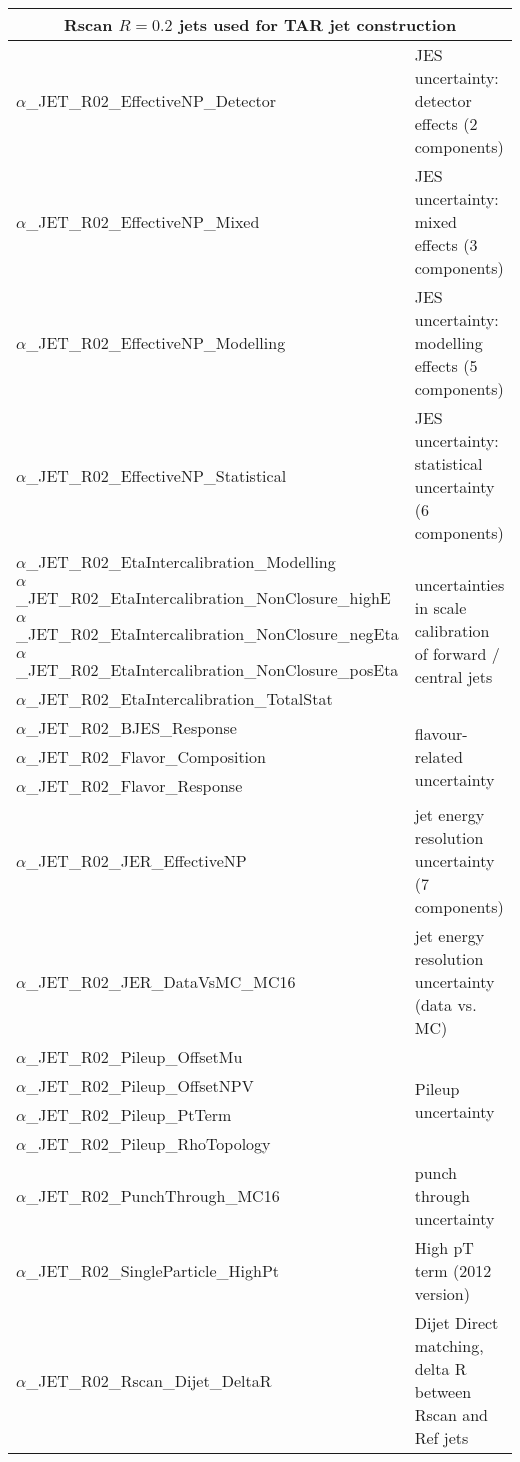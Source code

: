 {\begin{longtable}{p{7cm} p{8cm}}
\multicolumn{2}{c}{\textbf{Rscan \(R=0.2\) jets used for TAR jet construction }}  \\
\midrule
\(\alpha\)\_JET\_R02\_EffectiveNP\_Detector   & JES uncertainty: detector effects (2 components)        \\
\(\alpha\)\_JET\_R02\_EffectiveNP\_Mixed      & JES uncertainty: mixed effects (3 components)            \\
\(\alpha\)\_JET\_R02\_EffectiveNP\_Modelling  & JES uncertainty: modelling effects (5 components)         \\
\(\alpha\)\_JET\_R02\_EffectiveNP\_Statistical  & JES uncertainty: statistical uncertainty (6 components)         \\
\(\alpha\)\_JET\_R02\_EtaIntercalibration\_Modelling            & \multirow{5}{*}{uncertainties in scale calibration of forward / central jets}  \\
\(\alpha\)\_JET\_R02\_EtaIntercalibration\_NonClosure\_highE    &  \\
\(\alpha\)\_JET\_R02\_EtaIntercalibration\_NonClosure\_negEta  &   \\
\(\alpha\)\_JET\_R02\_EtaIntercalibration\_NonClosure\_posEta  &  \\
\(\alpha\)\_JET\_R02\_EtaIntercalibration\_TotalStat &  \\
\(\alpha\)\_JET\_R02\_BJES\_Response      & \multirow{3}{*}{flavour-related uncertainty}  \\
\(\alpha\)\_JET\_R02\_Flavor\_Composition &   \\
\(\alpha\)\_JET\_R02\_Flavor\_Response    &  \\
\(\alpha\)\_JET\_R02\_JER\_EffectiveNP    & jet energy resolution uncertainty (7 components)  \\
\(\alpha\)\_JET\_R02\_JER\_DataVsMC\_MC16 & jet energy resolution uncertainty (data vs. MC)  \\
\(\alpha\)\_JET\_R02\_Pileup\_OffsetMu    &  \multirow{4}{*}{Pileup uncertainty}  \\
\(\alpha\)\_JET\_R02\_Pileup\_OffsetNPV   &  \\
\(\alpha\)\_JET\_R02\_Pileup\_PtTerm &  \\
\(\alpha\)\_JET\_R02\_Pileup\_RhoTopology &   \\
\(\alpha\)\_JET\_R02\_PunchThrough\_MC16 & punch through uncertainty  \\
\(\alpha\)\_JET\_R02\_SingleParticle\_HighPt  & High pT term (2012 version)  \\
\(\alpha\)\_JET\_R02\_Rscan\_Dijet\_DeltaR & Dijet Direct matching, delta R between Rscan and Ref jets  \\

\end{longtable}}
